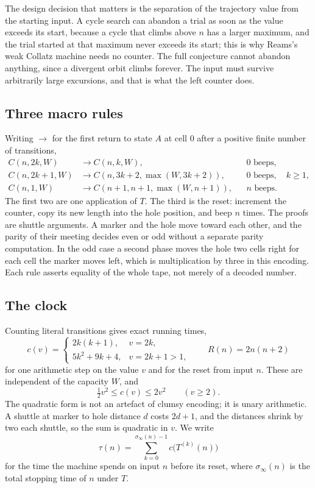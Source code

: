 The design decision that matters is the separation of the trajectory value from the starting input. A cycle search can abandon a trial as soon as the value exceeds its start, because a cycle that climbs above $n$ has a larger maximum, and the trial started at that maximum never exceeds its start; this is why Reams's weak Collatz machine needs no counter. The full conjecture cannot abandon anything, since a divergent orbit climbs forever. The input must survive arbitrarily large excursions, and that is what the left counter does.

\subsection{Three macro rules}

Writing $\to$ for the first return to state $A$ at cell $0$ after a positive finite number of transitions,
\begin{align*}
C(n,2k,W) &\to C(n,k,W), && \text{0 beeps},\\
C(n,2k+1,W) &\to C(n,3k+2,\max(W,3k+2)), && \text{0 beeps},\quad k\ge1,\\
C(n,1,W) &\to C(n+1,n+1,\max(W,n+1)), && n \text{ beeps}.
\end{align*}
The first two are one application of $T$. The third is the reset: increment the counter, copy its new length into the hole position, and beep $n$ times. The proofs are shuttle arguments. A marker and the hole move toward each other, and the parity of their meeting decides even or odd without a separate parity computation. In the odd case a second phase moves the hole two cells right for each cell the marker moves left, which is multiplication by three in this encoding. Each rule asserts equality of the whole tape, not merely of a decoded number.

\subsection{The clock}

Counting literal transitions gives exact running times,
\[
c(v)=\begin{cases} 2k(k+1), & v=2k,\\ 5k^2+9k+4, & v=2k+1>1,\end{cases}
\qquad R(n)=2n(n+2)
\]
for one arithmetic step on the value $v$ and for the reset from input $n$. These are independent of the capacity $W$, and
\begin{equation}\label{eq:ch21:cbound}
\tfrac12v^2\le c(v)\le2v^2\qquad(v\ge2).
\end{equation}
The quadratic form is not an artefact of clumsy encoding; it is unary arithmetic. A shuttle at marker to hole distance $d$ costs $2d+1$, and the distances shrink by two each shuttle, so the sum is quadratic in $v$. We write
\[
\tau(n)=\sum_{k=0}^{\sigma_\infty(n)-1} c\bigl(T^{(k)}(n)\bigr)
\]
for the time the machine spends on input $n$ before its reset, where $\sigma_\infty(n)$ is the total stopping time of $n$ under $T$.

